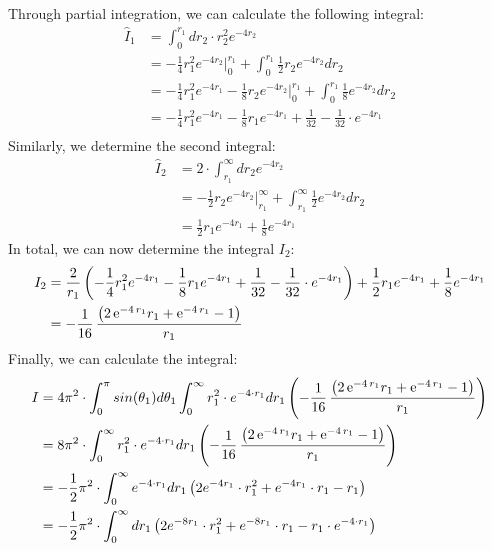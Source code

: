 \documentclass[10pt,a4paper]{article}
\begin{document}
Through partial integration, we can calculate the following integral:
\begin{align}
\hat{I}_1&=\int_{0}^{r_1} dr_2 \cdot r_2^2 e^{-4 r_2}\\
&= -\frac{1}{4} r_1^2 e^{-4r_2}|_0^{r_1} +\int_0^{r_1} \frac{1}{2} r_2 e^{-4 r_2}dr_2\\
&=-\frac{1}{4}r_1^2 e^{-4 r_1}-\frac{1}{8}r_2 e^{-4r_2} |_0^{r_1} + \int_0^{r_1} \frac{1}{8} e^{-4 r_2} dr_2\\
&=-\frac{1}{4}r_1^2 e^{-4 r_1}-\frac{1}{8}r_1 e^{-4r_1} + \frac{1}{32}-\frac{1}{32} \cdot e^{-4 r_1}\\
\end{align}
Similarly, we determine the second integral:
\begin{align}
\hat{I}_2 &= 2 \cdot\int_{r_1}^{\infty} dr_2 e^{-4r_2}\\
&= -\frac{1}{2} r_2 e^{-4 r_2} |_{r_1}^{\infty} + \int_{r_1}^{\infty} \frac{1}{2} e^{-4 r_2} dr_2 \\
&=\frac{1}{2} r_1 e^{-4 r_1} + \frac{1}{8} e^{-4 r_1} 
\end{align}
In total, we can now determine the integral $I_2$:
\begin{align}
I_2 &=  \frac{2}{r_1}\left(-\frac{1}{4}r_1^2 e^{-4 r_1}-\frac{1}{8}r_1 e^{-4r_1} + \frac{1}{32}-\frac{1}{32} \cdot e^{-4 r_1}\right) + \frac{1}{2} r_1 e^{-4 r_1} + \frac{1}{8} e^{-4 r_1} \\
&= -\frac{1}{16}\,{\frac { \left( 2\,{{\rm e}^{-
4\,r_1}}r_1+{{\rm e}^{-4\,r_1}}-1 \right) }{r_1}}
\end{align}
Finally, we can calculate the integral:
\begin{align}
I&= 4 \pi^2 \cdot \int_{0}^{ \pi} sin(\theta_1) d\theta_1 \int_{0}^{\infty}  r_1^2 \cdot e^{-4 \cdot r_1} dr_1 \left( -\frac{1}{16}\,{\frac { \left( 2\,{{\rm e}^{-
4\,r_1}}r_1+{{\rm e}^{-4\,r_1}}-1 \right) }{r_1}} \right)\\
&= 8 \pi^2 \cdot \int_{0}^{\infty}  r_1^2 \cdot e^{-4 \cdot r_1} dr_1 \left( -\frac{1}{16}\,{\frac { \left( 2\,{{\rm e}^{-
4\,r_1}}r_1+{{\rm e}^{-4\,r_1}}-1 \right) }{r_1}}\right)\\
&=-\frac{1}{2}\pi^2 \cdot \int_0^{\infty} e^{-4 \cdot r_1} dr_1 \left( 2 e^{-4r_1} \cdot r_1^2 + e^{-4r_1} \cdot r_1 - r_1 \right)\\
&=-\frac{1}{2}\pi^2 \cdot \int_0^{\infty}  dr_1 \left( 2 e^{-8r_1} \cdot r_1^2 + e^{-8r_1} \cdot r_1 - r_1 \cdot e^{-4 \cdot r_1} \right)\\
\end{align}
\end{document}
